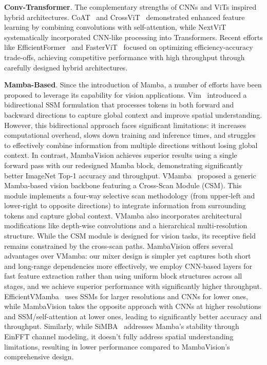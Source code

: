 \documentclass[10pt,twocolumn,letterpaper]{article}
\begin{document}
\textbf{Conv-Transformer}. The complementary strengths of CNNs and ViTs inspired hybrid architectures. CoAT~\cite{xu2021co} and CrossViT~\cite{chen2021crossvit} demonstrated enhanced feature learning by combining convolutions with self-attention, while NextViT~\cite{li2022next} systematically incorporated CNN-like processing into Transformers. Recent efforts like EfficientFormer~\cite{li2022efficientformer} and FasterViT~\cite{hatamizadeh2023fastervit} focused on optimizing efficiency-accuracy trade-offs, achieving competitive performance with high throughput through carefully designed hybrid architectures.

\textbf{Mamba-Based}. Since the introduction of Mamba, a number of efforts have been proposed to leverage its capability for vision applications. Vim~\cite{zhu2024vision} introduced a bidirectional SSM formulation that processes tokens in both forward and backward directions to capture global context and improve spatial understanding. However, this bidirectional approach faces significant limitations: it increases computational overhead, slows down training and inference times, and struggles to effectively combine information from multiple directions without losing global context. In contrast, MambaVision achieves superior results using a single forward pass with our redesigned Mamba block, demonstrating significantly better ImageNet Top-1 accuracy and throughput.
VMamba~\cite{liu2024vmamba} proposed a generic Mamba-based vision backbone featuring a Cross-Scan Module (CSM). This module implements a four-way selective scan methodology (from upper-left and lower-right to opposite directions) to integrate information from surrounding tokens and capture global context. VMamba also incorporates architectural modifications like depth-wise convolutions and a hierarchical multi-resolution structure. While the CSM module is designed for vision tasks, its receptive field remains constrained by the cross-scan paths. MambaVision offers several advantages over VMamba: our mixer design is simpler yet captures both short and long-range dependencies more effectively, we employ CNN-based layers for fast feature extraction rather than using uniform block structures across all stages, and we achieve superior performance with significantly higher throughput.
EfficientVMamba~\cite{pei2024efficientvmamba} uses SSMs for larger resolutions and CNNs for lower ones, while MambaVision takes the opposite approach with CNNs at higher resolutions and SSM/self-attention at lower ones, leading to significantly better accuracy and throughput. Similarly, while SiMBA~\cite{patro2024simba} addresses Mamba's stability through EinFFT channel modeling, it doesn't fully address spatial understanding limitations, resulting in lower performance compared to MambaVision's comprehensive design.
\end{document}
